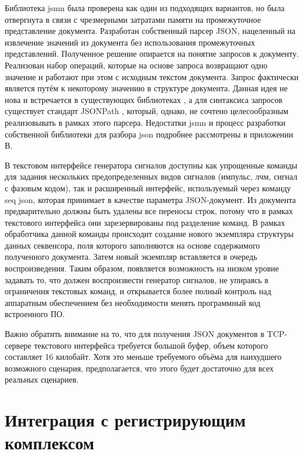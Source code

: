 \documentclass{report}
\begin{document}
Библиотека jsmn \cite{jsmn} была проверена как один из подходящих вариантов, но была отвергнута в связи с чрезмерными затратами памяти на промежуточное представление документа. Разработан собственный парсер JSON, нацеленный на извлечение значений из документа без использования промежуточных представлений. Полученное решение опирается на понятие запросов к документу. Реализован набор операций, которые на основе запроса возвращают одно значение и работают при этом с исходным текстом документа. Запрос фактически является путём к некоторому значению в структуре документа. Данная идея не нова и встречается в существующих библиотеках \cite{jread}, а для синтаксиса запросов существует стандарт JSONPath \cite{jsonpath}, который, однако, не сочтено целесообразным реализовывать в рамках этого парсера. Недостатки jsmn и процесс разработки собственной библиотеки для разбора json подробнее рассмотрены в приложении В.

В текстовом интерфейсе генератора сигналов доступны как упрощенные команды для задания нескольких предопределенных видов сигналов (импульс, лчм, сигнал с фазовым кодом), так и расширенный интерфейс, используемый через команду seq json, которая принимает в качестве параметра JSON-документ. Из документа предварительно должны быть удалены все переносы строк, потому что в рамках текстового интерфейса они зарезервированы под разделение команд. В рамках обработчика данной команды происходит создание нового экземпляра структуры данных секвенсора, поля которого заполняются на основе содержимого полученного документа. Затем новый экземпляр вставляется в очередь воспроизведения. Таким образом, появляется возможность на низком уровне задавать то, что должен воспроизвести генератор сигналов, не упираясь в ограничения текстовых команд, и открывается более полный контроль над аппаратным обеспечением без необходимости менять программный код встроенного ПО.

Важно обратить внимание на то, что для получения JSON документов в TCP-сервере текстового интерфейса требуется большой буфер, объем которого составляет 16 килобайт. Хотя это меньше требуемого объёма для наихудшего возможного сценария, предполагается, что этого будет достаточно для всех реальных сценариев.

\section{Интеграция с регистрирующим комплексом}
\end{document}
